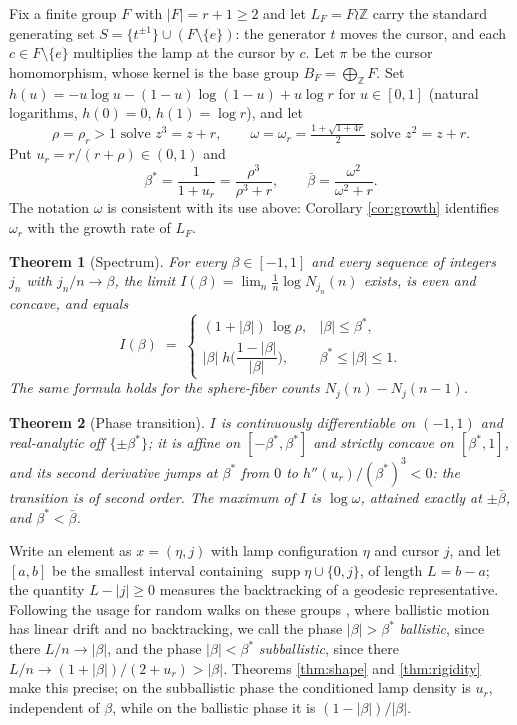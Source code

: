 \documentclass[11pt]{amsart}
\newtheorem{theorem}{Theorem}[section]
\theoremstyle{definition}
\theoremstyle{remark}
\newcommand{\Z}{\mathbb{Z}}
\newcommand{\supp}{\operatorname{supp}}
\begin{document}
Fix a finite group $F$ with $|F|=r+1\ge2$ and let $L_F=F\wr\Z$ carry the standard generating set $S=\{t^{\pm1}\}\cup(F\setminus\{e\})$: the generator $t$ moves the cursor, and each $c\in F\setminus\{e\}$ multiplies the lamp at the cursor by $c$. Let $\pi$ be the cursor homomorphism, whose kernel is the base group $B_F=\bigoplus_{\Z}F$. Set $h(u)=-u\log u-(1-u)\log(1-u)+u\log r$ for $u\in[0,1]$ (natural logarithms, $h(0)=0$, $h(1)=\log r$), and let
\[
\rho=\rho_r>1 \text{ solve } z^3=z+r,
\qquad
\omega=\omega_r=\tfrac{1+\sqrt{1+4r}}2 \text{ solve } z^2=z+r .
\]
Put $u_r=r/(r+\rho)\in(0,1)$ and
\[
\beta^{*}=\frac{1}{1+u_r}=\frac{\rho^{3}}{\rho^{3}+r},
\qquad
\bar\beta=\frac{\omega^{2}}{\omega^{2}+r}.
\]
The notation $\omega$ is consistent with its use above: Corollary \ref{cor:growth} identifies $\omega_r$ with the growth rate of $L_F$.

\begin{theorem}[Spectrum]\label{thm:spectrum}
For every $\beta\in[-1,1]$ and every sequence of integers $j_n$ with $j_n/n\to\beta$, the limit
$I(\beta)=\lim_n\frac1n\log N_{j_n}(n)$ exists, is even and concave, and equals
\[
I(\beta)\;=\;
\begin{cases}
(1+|\beta|)\,\log\rho, & |\beta|\le\beta^{*},\\[2pt]
|\beta|\;h\!\Big(\dfrac{1-|\beta|}{|\beta|}\Big), & \beta^{*}\le|\beta|\le1 .
\end{cases}
\]
The same formula holds for the sphere-fiber counts $N_j(n)-N_j(n-1)$.
\end{theorem}

\begin{theorem}[Phase transition]\label{thm:transition}
$I$ is continuously differentiable on $(-1,1)$ and real-analytic off $\{\pm\beta^{*}\}$; it is affine on $[-\beta^{*},\beta^{*}]$ and strictly concave on $[\beta^{*},1]$, and its second derivative jumps at $\beta^{*}$ from $0$ to $h''(u_r)/(\beta^{*})^{3}<0$: the transition is of second order. The maximum of $I$ is $\log\omega$, attained exactly at $\pm\bar\beta$, and $\beta^{*}<\bar\beta$.
\end{theorem}

Write an element as $x=(\eta,j)$ with lamp configuration $\eta$ and cursor $j$, and let $[a,b]$ be the smallest interval containing $\supp\eta\cup\{0,j\}$, of length $L=b-a$; the quantity $L-|j|\ge0$ measures the backtracking of a geodesic representative. Following the usage for random walks on these groups \cite{LPP96,PSC02}, where ballistic motion has linear drift and no backtracking, we call the phase $|\beta|>\beta^{*}$ \emph{ballistic}, since there $L/n\to|\beta|$, and the phase $|\beta|<\beta^{*}$ \emph{subballistic}, since there $L/n\to(1+|\beta|)/(2+u_r)>|\beta|$. Theorems \ref{thm:shape} and \ref{thm:rigidity} make this precise; on the subballistic phase the conditioned lamp density is $u_r$, independent of $\beta$, while on the ballistic phase it is $(1-|\beta|)/|\beta|$.
\end{document}
